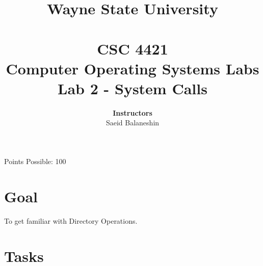 \documentclass[16pt]{article}
\begin{document}
\title{\huge \textbf{Wayne State University \\
 \vline \\
\Huge CSC 4421 \\
 Computer Operating Systems Labs\\
 Lab 2 - System Calls}\\
 \vline
 }
\author{\textbf{Instructors}  \vspace{0.2cm} \\
Saeid Balaneshin
}
\date{}
\maketitle

\begin{center}
\Large Points Possible: 100

\end{center}

\section*{Goal}

To get familiar with Directory Operations.

\section*{Tasks}
\end{document}
